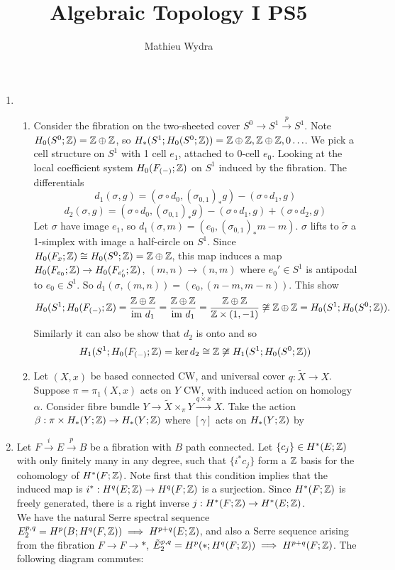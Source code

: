 \documentclass[10pt,a4paper]{article}
\title{Algebraic Topology I PS5}
\author{Mathieu Wydra}
\date{}
\begin{document}
\maketitle
\begin{enumerate}
\item \begin{enumerate}
\item Consider the fibration on the two-sheeted cover $S^0\to S^1\xrightarrow{p} S^1$. Note $H_0(S^0;\mathbb{Z}) = \mathbb{Z}\oplus \mathbb{Z}$, so $H_*(S^1;H_0(S^0;\mathbb{Z})) = \mathbb{Z}\oplus\mathbb{Z},\mathbb{Z}\oplus \mathbb{Z}, 0\ldots$. We pick a cell structure on $S^1$ with 1 cell $e_1$, attached to 0-cell $e_0$. Looking at the local coefficient system $H_0(F_{(-)};\mathbb{Z})$ on $S^1$ induced by the fibration. The differentials
\[d_1(\sigma,g) = (\sigma\circ d_0, (\sigma_{0,1})_*g) - (\sigma\circ d_1,g)\]
\[d_2(\sigma,g) = (\sigma\circ d_0, (\sigma_{0,1})_*g) - (\sigma\circ d_1,g) + (\sigma\circ d_2,g)\]
Let $\sigma$ have image $e_1$, so $d_1(\sigma,m) = (e_0, (\sigma_{0,1})_*m-m)$. $\sigma$ lifts to $\tilde{\sigma}$ a 1-simplex with image a half-circle on $S^1$. Since $H_0(F_x;\mathbb{Z}) \cong H_0(S^0;\mathbb{Z}) = \mathbb{Z}\oplus \mathbb{Z}$, this map induces a map $H_0(F_{e_0};\mathbb{Z})\to H_0(F_{e_0'};\mathbb{Z})$, $(m,n)\to (n,m)$ where $e_0'\in S^1$ is antipodal to $e_0\in S^1$. So $d_1(\sigma, (m,n)) = (e_0, (n-m,m-n))$. This show  
\[H_0(S^1; H_0(F_{(-)};\mathbb{Z}) = \frac{\mathbb{Z}\oplus \mathbb{Z}}{\text{im }d_1} = \frac{\mathbb{Z}\oplus \mathbb{Z}}{\text{im }d_1} = \frac{\mathbb{Z}\oplus \mathbb{Z}}{\mathbb{Z}\times (1,-1)} \not\cong \mathbb{Z}\oplus \mathbb{Z} = H_0(S^1;H_0(S^0;\mathbb{Z})).\]
Similarly it can also be show that $d_2$ is onto and so 
\[H_1(S^1; H_0(F_{(-)};\mathbb{Z}) = \ker d_2 \cong \mathbb{Z} \not\cong H_1(S^1;H_0(S^0;\mathbb{Z}))\]

\item Let $(X,x)$ be based connected CW, and universal cover $q:\tilde{X}\to X$. Suppose $\pi = \pi_1(X,x)$ acts on $Y$ CW, with induced action on homology $\alpha$. Consider fibre bundle $Y\to \tilde{X}\times_\pi Y \xrightarrow{q\times x} X$. Take the action $\beta:\pi\times H_*(Y;\mathbb{Z})\to H_*(Y;\mathbb{Z})$ where $[\gamma]$ acts on $H_*(Y;\mathbb{Z})$ by 
\end{enumerate}
\item Let $F\xrightarrow{i }E \xrightarrow{p} B$ be a fibration with $B$ path connected. Let $\{c_j\}\in H^*(E;\mathbb{Z})$ with only finitely many in any degree, such that $\{i^*c_j\}$ form a $\mathbb{Z}$ basis for the cohomology of $H^*(F;\mathbb{Z})$. Note first that this condition implies that the induced map is $i^*:H^q(E;\mathbb{Z})\to H^q(F;\mathbb{Z})$ is a surjection. Since $H^*(F;\mathbb{Z})$ is freely generated, there is a right inverse $j:H^*(F;\mathbb{Z})\to H^*(E;\mathbb{Z})$.\\
We have the natural Serre spectral sequence $E^{p,q}_2 = H^p(B;H^q(F,\mathbb{Z}))\implies H^{p+q}(E;\mathbb{Z})$, and also a Serre sequence arising from the fibration $F\to F\to *$, $\tilde{E}^{p,q}_2 = H^p(*; H^q(F;\mathbb{Z}))\implies H^{p+q}(F;\mathbb{Z})$. The following diagram commutes:


\end{enumerate}
\end{document}
